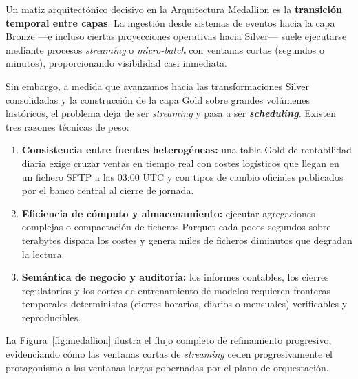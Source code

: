 Un matiz arquitectónico decisivo en la Arquitectura Medallion es la \textbf{transición temporal entre capas}. La ingestión desde sistemas de eventos hacia la capa Bronze ---e incluso ciertas proyecciones operativas hacia Silver--- suele ejecutarse mediante procesos \textit{streaming} o \textit{micro-batch} con ventanas cortas (segundos o minutos), proporcionando visibilidad casi inmediata.

Sin embargo, a medida que avanzamos hacia las transformaciones Silver consolidadas y la construcción de la capa Gold sobre grandes volúmenes históricos, el problema deja de ser \textit{streaming} y pasa a ser \textbf{\textit{scheduling}}. Existen tres razones técnicas de peso:
\begin{enumerate}
  \item \textbf{Consistencia entre fuentes heterogéneas:} una tabla Gold de rentabilidad diaria exige cruzar ventas en tiempo real con costes logísticos que llegan en un fichero SFTP a las 03:00 UTC y con tipos de cambio oficiales publicados por el banco central al cierre de jornada.
  \item \textbf{Eficiencia de cómputo y almacenamiento:} ejecutar agregaciones complejas o compactación de ficheros Parquet cada pocos segundos sobre terabytes dispara los costes y genera miles de ficheros diminutos que degradan la lectura.
  \item \textbf{Semántica de negocio y auditoría:} los informes contables, los cierres regulatorios y los cortes de entrenamiento de modelos requieren fronteras temporales deterministas (cierres horarios, diarios o mensuales) verificables y reproducibles.
\end{enumerate}

La Figura~\ref{fig:medallion} ilustra el flujo completo de refinamiento progresivo, evidenciando cómo las ventanas cortas de \textit{streaming} ceden progresivamente el protagonismo a las ventanas largas gobernadas por el plano de orquestación.

